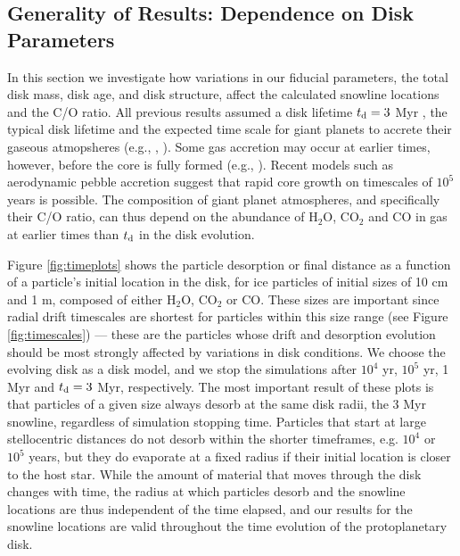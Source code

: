 \documentclass[apj]{emulateapj}
\begin{document}
\subsection{Generality of Results: Dependence on Disk Parameters}
\label{sec:incond}

In this section we investigate how variations in our fiducial parameters, the total disk mass, disk age, and disk structure, %
affect the calculated snowline locations and the C/O ratio. %
All previous results assumed a disk lifetime $t_{\rm d}=3$ Myr%
, the typical disk lifetime and the expected time scale for giant planets to accrete their gaseous atmopsheres (e.g., \citealt{pollack96}, \citealt{piso14}). Some gas accretion may occur at earlier times, however,%
before the core is fully formed (e.g., \citealt{rafikov06}). Recent models such as aerodynamic pebble accretion \citep{lambrechts12} suggest that rapid core growth on timescales of $10^5$ years is possible. %
The composition of giant planet atmospheres, and specifically their C/O ratio, can thus depend on the abundance of H$_2$O, CO$_2$ and CO in gas at earlier times than $t_{\rm d}$ in the disk evolution. 

Figure \ref{fig:timeplots} shows the particle desorption or final distance as a function of a particle's initial location in the disk, for ice particles %
of initial sizes of 10 cm and 1 m, composed of either H$_2$O, CO$_2$ or CO. These sizes are important since radial drift timescales are shortest for particles within this size range (see Figure \ref{fig:timescales}) --- these are the particles whose drift and desorption evolution should be most strongly affected by variations in disk conditions. We choose the evolving disk as a disk model, and we stop the simulations after $10^4$ yr, $10^5$ yr, 1 Myr and $t_{\rm d}=3$ Myr, respectively. %
The most important result of these plots is that particles of a given size always desorb at the same disk radii, the 3 Myr snowline, regardless of simulation stopping time.  Particles %
that start at large stellocentric distances do not desorb within the shorter timeframes, e.g. $10^4$ or $10^5$ years, but they do evaporate at a fixed radius if their initial location is closer to the host star. While the amount of material that moves through the disk changes with time, the radius at which particles desorb and 
the snowline locations are thus independent of the time elapsed, and %
our results for the snowline locations are %
valid throughout the time evolution of the protoplanetary disk. 
\end{document}
